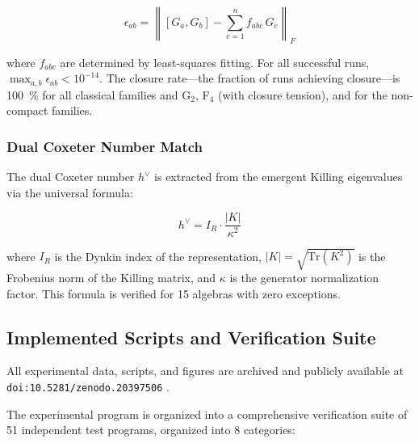 \begin{equation}
\epsilon_{ab} = \left\|[G_a, G_b] - \sum_{c=1}^n f_{abc}\,G_c\right\|_F
\end{equation}

where $f_{abc}$ are determined by least-squares fitting. For all successful runs, $\max_{a,b} \epsilon_{ab} < 10^{-14}$. The closure rate---the fraction of runs achieving closure---is \SI{100}{\percent} for all classical families and G$_2$, F$_4$ (with closure tension), and for the non-compact families.

\subsubsection{Dual Coxeter Number Match}

The dual Coxeter number $h^\vee$ is extracted from the emergent Killing eigenvalues via the universal formula:

\begin{equation}
h^\vee = I_R \cdot \frac{|K|}{\kappa^2}
\end{equation}

where $I_R$ is the Dynkin index of the representation, $|K| = \sqrt{\mathrm{Tr}(K^2)}$ is the Frobenius norm of the Killing matrix, and $\kappa$ is the generator normalization factor. This formula is verified for 15 algebras with zero exceptions.
\subsection{Implemented Scripts and Verification Suite}\label{sec:implemented_scripts}

All experimental data, scripts, and figures are archived and publicly available at \texttt{doi:10.5281/zenodo.20397506} \cite{sspeg_repo}.

The experimental program is organized into a comprehensive verification suite of 51 independent
test programs, organized into 8 categories:


